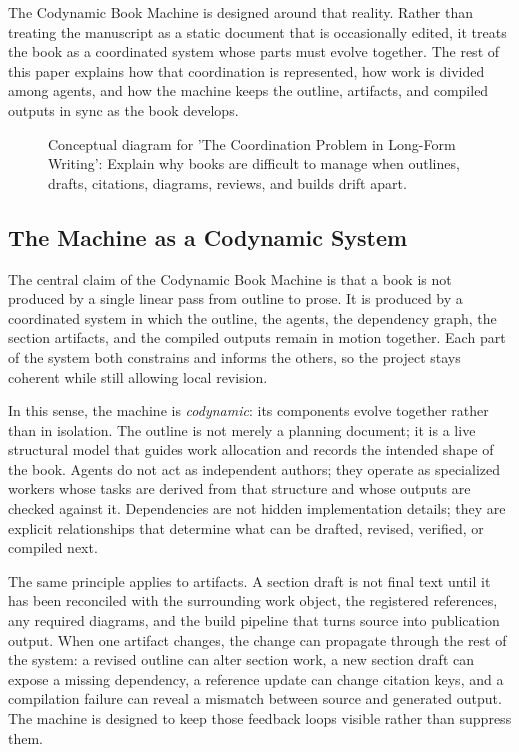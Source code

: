 \documentclass[11pt]{article}
\begin{document}
The Codynamic Book Machine is designed around that reality. Rather than treating the manuscript as a static document that is occasionally edited, it treats the book as a coordinated system whose parts must evolve together. The rest of this paper explains how that coordination is represented, how work is divided among agents, and how the machine keeps the outline, artifacts, and compiled outputs in sync as the book develops.

\begin{figure}[htbp]
\centering

\caption{Conceptual diagram for 'The Coordination Problem in Long-Form Writing': Explain why books are difficult to manage when outlines, drafts, citations, diagrams, reviews, and builds drift apart.}
\end{figure}



\subsection{The Machine as a Codynamic System}


The central claim of the Codynamic Book Machine is that a book is not produced by a single linear pass from outline to prose. It is produced by a coordinated system in which the outline, the agents, the dependency graph, the section artifacts, and the compiled outputs remain in motion together. Each part of the system both constrains and informs the others, so the project stays coherent while still allowing local revision.

In this sense, the machine is \emph{codynamic}: its components evolve together rather than in isolation. The outline is not merely a planning document; it is a live structural model that guides work allocation and records the intended shape of the book. Agents do not act as independent authors; they operate as specialized workers whose tasks are derived from that structure and whose outputs are checked against it. Dependencies are not hidden implementation details; they are explicit relationships that determine what can be drafted, revised, verified, or compiled next.

The same principle applies to artifacts. A section draft is not final text until it has been reconciled with the surrounding work object, the registered references, any required diagrams, and the build pipeline that turns source into publication output. When one artifact changes, the change can propagate through the rest of the system: a revised outline can alter section work, a new section draft can expose a missing dependency, a reference update can change citation keys, and a compilation failure can reveal a mismatch between source and generated output. The machine is designed to keep those feedback loops visible rather than suppress them.
\end{document}

